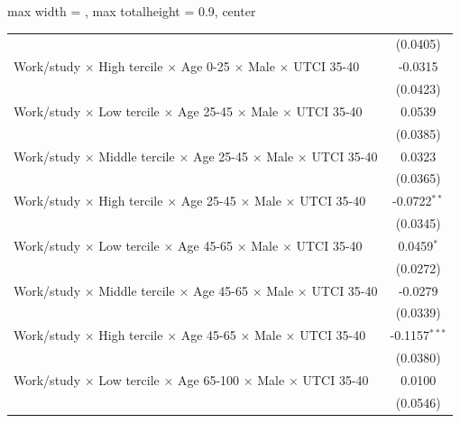\begin{table}[htbp]
\begin{adjustbox}{max width = \textwidth, max totalheight = 0.9\textheight, center}
\begin{tabular}{lc}
                                                                                                        & (0.0405)\\   
         Work/study $\times$ High tercile $\times$ Age 0-25 $\times$ Male $\times$ UTCI 35-40           & -0.0315\\   
                                                                                                        & (0.0423)\\   
         Work/study $\times$ Low tercile $\times$ Age 25-45 $\times$ Male $\times$ UTCI 35-40           & 0.0539\\   
                                                                                                        & (0.0385)\\   
         Work/study $\times$ Middle tercile $\times$ Age 25-45 $\times$ Male $\times$ UTCI 35-40        & 0.0323\\   
                                                                                                        & (0.0365)\\   
         Work/study $\times$ High tercile $\times$ Age 25-45 $\times$ Male $\times$ UTCI 35-40          & -0.0722$^{**}$\\   
                                                                                                        & (0.0345)\\   
         Work/study $\times$ Low tercile $\times$ Age 45-65 $\times$ Male $\times$ UTCI 35-40           & 0.0459$^{*}$\\   
                                                                                                        & (0.0272)\\   
         Work/study $\times$ Middle tercile $\times$ Age 45-65 $\times$ Male $\times$ UTCI 35-40        & -0.0279\\   
                                                                                                        & (0.0339)\\   
         Work/study $\times$ High tercile $\times$ Age 45-65 $\times$ Male $\times$ UTCI 35-40          & -0.1157$^{***}$\\   
                                                                                                        & (0.0380)\\   
         Work/study $\times$ Low tercile $\times$ Age 65-100 $\times$ Male $\times$ UTCI 35-40          & 0.0100\\   
                                                                                                        & (0.0546)\\   

\end{tabular}
\end{adjustbox}
\end{table}
